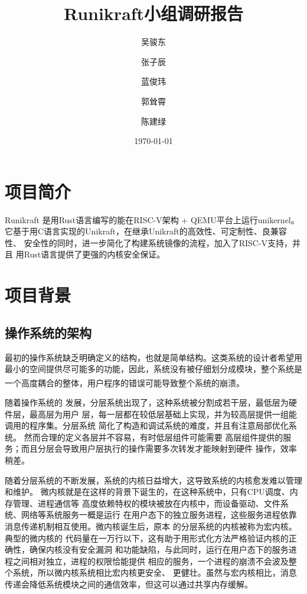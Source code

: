 \documentclass[UTF8,fontset=none,linespread=1.15]{ctexart}
\let\nosupcite\cite
\renewcommand*{\cite}[1]{\textsuperscript{\nosupcite{#1}}}
\begin{document}
\sffamily %
\title{\bfseries Runikraft小组\quad 调研报告}
\author{吴骏东\and 张子辰\and 蓝俊玮\and 郭耸霄\and 陈建绿}
\date{\today}
\maketitle

\tableofcontents

\section{项目简介}
Runikraft 是用Rust语言编写的能在RISC-V架构 + QEMU平台上运行unikernel。
它基于用C语言实现的Unikraft，在继承Unikraft的高效性、可定制性、良兼容性、
安全性的同时，进一步简化了构建系统镜像的流程，加入了RISC-V支持，并且
用Rust语言提供了更强的内核安全保证。
\section{项目背景}
\subsection{操作系统的架构}
最初的操作系统缺乏明确定义的结构，也就是简单结构。这类系统的设计者希望用
最小的空间提供尽可能多的功能，因此，系统没有被仔细划分成模块，整个系统是
一个高度耦合的整体，用户程序的错误可能导致整个系统的崩溃。\cite{bib:os-concept}

随着操作系统的
发展，分层系统出现了，这种系统被分割成若干层，最低层为硬件层，最高层为用户
层，每一层都在较低层基础上实现，并为较高层提供一组能调用的程序集。分层系统
简化了构造和调试系统的难度，并且有注意局部优化系统。
然而合理的定义各层并不容易，有时低层组件可能需要
高层组件提供的服务；而且分层会导致用户层执行的操作需要多次转发才能映射到硬件
操作，效率稍差。

随着分层系统的不断发展，系统的内核日益增大，这导致系统的内核愈发难以管理和维护。
微内核就是在这样的背景下诞生的，在这种系统中，只有CPU调度、内存管理、进程通信等
高度依赖特权的模块被放在内核中，而设备驱动、文件系统、网络等系统服务一概是运行
在用户态下的独立服务进程，这些服务进程依靠消息传递机制相互使用。微内核诞生后，原本
的分层系统的内核被称为宏内核。典型的微内核的
代码量在一万行以下，这有助于用形式化方法严格验证内核的正确性，确保内核没有安全漏洞
和功能缺陷，与此同时，运行在用户态下的服务进程之间相对独立，进程的权限恰能提供
相应的服务，一个进程的崩溃不会波及整个系统，所以微内核系统相比宏内核更安全、
更健壮。虽然与宏内核相比，消息传递会降低系统模块之间的通信效率，但这可以通过共享内存缓解。
\end{document}
